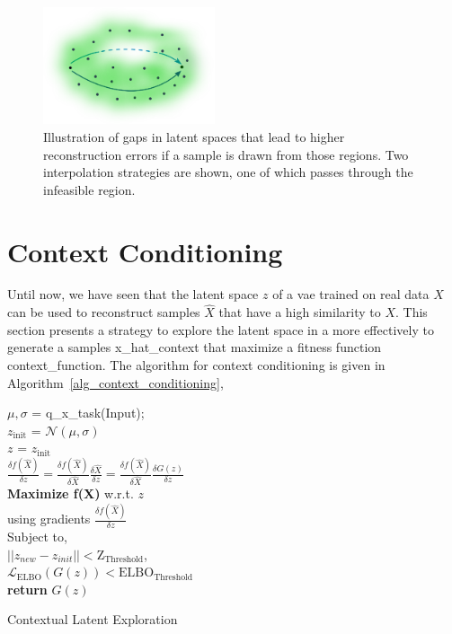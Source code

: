 \begin{figure}
\centering
\includegraphics[width=0.45\textwidth]{idetc-20/figure/fig_latent_gaps.eps}
  \caption{Illustration of gaps in latent spaces that lead to higher reconstruction errors if a sample is drawn from those regions. Two interpolation strategies are shown, one of which passes through the infeasible region.}
\label{fig_latent_space_gaps}
\end{figure}



\section{Context Conditioning}\label{sec_context}
Until now, we have seen that the latent space $z$ of a \ac{vae} trained on real data $X$ can be used to reconstruct samples $\hat{X}$ that have a high similarity to $X$. This section presents a strategy to explore the latent space in a more effectively to generate a samples \ac{x_hat_context} that maximize a fitness function \ac{context_function}. The algorithm for context conditioning is given in Algorithm~\ref{alg_context_conditioning},
\begin{algorithm}
    $\mu, \sigma$ = \ac{q_x_task}(Input);  \\
    $z_{\text{init}}$ = $\mathcal{N}(\mu, \sigma)$  \\
    $z$ = $z_{\text{init}}$ \\
    $\frac{\delta f(\hat{X})}{\delta z} = \frac{\delta f(\hat{X})}{\delta \hat{X}} \frac{\delta \hat{X}}{\delta z} = 
    \frac{\delta f(\hat{X})}{\delta \hat{X}} \frac{\delta G(z)}{\delta z}
    $   \\
    \textbf{Maximize f(X)} w.r.t. $z$ \\
     using gradients $\frac{\delta f(\hat{X})}{\delta z}$\\
     Subject to, \\
     $||z_{new} - z_{init}|| < \text{Z}_{\text{Threshold}}$,\\
     $\mathcal{L}_{\text{ELBO}}(G(z)) <  \text{ELBO}_{\text{Threshold}}$ \\
     \textbf{return} $G(z)$
    \caption{Contextual Latent Exploration}
    \label{alg_context_conditioning}
\end{algorithm}

